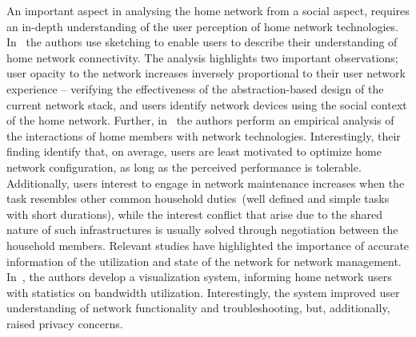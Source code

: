 An important aspect in analysing the home network from a social aspect, requires
an in-depth understanding of the user perception of  home network technologies.
In~\cite{shehanpoole08,grinter05} the authors use sketching to enable users to
describe their understanding of home network connectivity. The analysis
highlights two important observations; user opacity to the network increases
inversely proportional to their user network experience -- verifying the
effectiveness of the abstraction-based design of the current network stack, and
users identify network devices using the social context of the home network.
Further, in~\cite{tolmie07} the authors perform an empirical analysis of the
interactions of home members with network technologies.  Interestingly, their
finding identify that, on average, users are least motivated to optimize home
network configuration, as long as the perceived performance is tolerable.
Additionally, users interest to engage in network maintenance increases when the
task resembles other common household duties~(well defined and simple tasks with
short durations), while the interest conflict that arise due to the shared
nature of such infrastructures is usually solved through negotiation between the
household members. Relevant studies have highlighted the importance of accurate
information of the utilization and state of the network for network management.
In~\cite{Chetty10}, the authors develop a visualization system, informing home
network users with statistics on bandwidth utilization.  Interestingly, the
system improved user understanding of network functionality and troubleshooting,
but, additionally, raised privacy concerns. 

